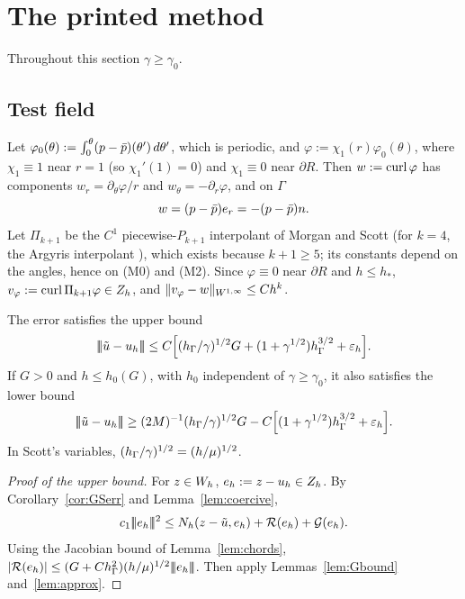\section{The printed method}\label{sec:printed}

Throughout this section $\gamma\ge\gamma_0$.

\subsection*{Test field}
Let $\varphi_0(\theta):=\int_0^\theta(p-\bar p)(\theta')\,d\theta'$, which is periodic, and $\varphi:=\chi_1(r)\varphi_0(\theta)$, where $\chi_1\equiv1$ near $r=1$ (so $\chi_1'(1)=0$) and $\chi_1\equiv0$ near $\partial R$.
Then $w:=\operatorname{curl}\varphi$ has components $w_r=\partial_\theta\varphi/r$ and $w_\theta=-\partial_r\varphi$, and on $\Gamma$
\[
w=(p-\bar p)e_r=-(p-\bar p)n .
\]
Let $\Pi_{k+1}$ be the $C^1$ piecewise-$P_{k+1}$ interpolant of Morgan and Scott \cite{MorganScott1975} (for $k=4$, the Argyris interpolant \cite{Argyris1968}), which exists because $k+1\ge5$; its constants depend on the angles, hence on (M0) and (M2). Since $\varphi\equiv0$ near $\partial R$ and $h\le h_\ast$, $v_\varphi:=\operatorname{curl}\Pi_{k+1}\varphi\in Z_h$, and $\lVert v_\varphi-w\rVert_{W^{1,\infty}}\le Ch^k$.

\begin{theorem}\label{thm:A}
The error satisfies the upper bound
\[
|\!|\!|\tilde u-u_h|\!|\!|\le C\Bigl[(h_\Gamma/\gamma)^{1/2}G+(1+\gamma^{1/2})h_\Gamma^{3/2}+\varepsilon_h\Bigr].
\]
If $G>0$ and $h\le h_0(G)$, with $h_0$ independent of $\gamma\ge\gamma_0$, it also satisfies the lower bound
\[
|\!|\!|\tilde u-u_h|\!|\!|\ge(2M)^{-1}(h_\Gamma/\gamma)^{1/2}G-C\Bigl[(1+\gamma^{1/2})h_\Gamma^{3/2}+\varepsilon_h\Bigr].
\]
In Scott's variables, $(h_\Gamma/\gamma)^{1/2}=(h/\mu)^{1/2}$.
\end{theorem}

\begin{proof}[Proof of the upper bound]
For $z\in W_h$, $e_h:=z-u_h\in Z_h$. By Corollary~\ref{cor:GSerr} and Lemma~\ref{lem:coercive},
\[
c_1|\!|\!|e_h|\!|\!|^2\le N_h(z-\tilde u,e_h)+\mathcal R(e_h)+\mathcal G(e_h).
\]
Using the Jacobian bound of Lemma~\ref{lem:chords}, $|\mathcal R(e_h)|\le(G+Ch_\Gamma^2)(h/\mu)^{1/2}|\!|\!|e_h|\!|\!|$. Then apply Lemmas~\ref{lem:Gbound} and~\ref{lem:approx}.
\end{proof}

